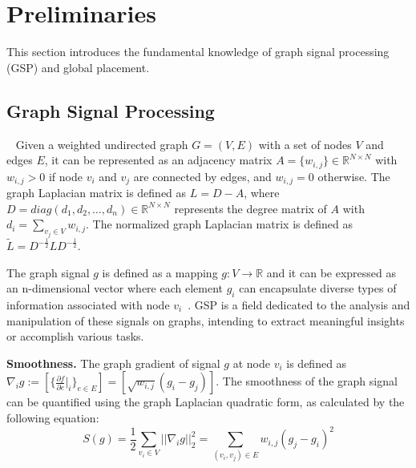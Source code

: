 \section{Preliminaries} \label{sec:pre}
This section introduces the fundamental knowledge of graph signal processing (GSP) and global placement.

\subsection{Graph Signal Processing}~\label{sec:gsp}
Given a weighted undirected graph $G = (V, E)$ with a set of nodes $V$ and edges $E$, it can be represented as an adjacency matrix $A =\{w_{i,j}\}\in \mathbb{R}^{N \times N}$ with $w_{i,j}>0$ if node $v_i$ and $v_j$ are connected by edges, and $w_{i,j}=0$ otherwise. The graph Laplacian matrix is defined as $L = D-A$, where $D =diag(d_1, d_2, \ldots, d_n )\in \mathbb{R}^{N \times N}$ represents the degree matrix of $A$ with $d_i=\sum_{v_j \in V}w_{i,j}$. The normalized graph Laplacian matrix is defined as $\tilde{L}=D^{-\frac{1}{2}}LD^{-\frac{1}{2}}$.

The graph signal $g$ is defined as a mapping $g : V \to \mathbb{R}$ and it can be expressed as an n-dimensional vector where each element $g_i$ can encapsulate diverse types of information associated with node $v_i$~\cite{graph_signal}. 
GSP is a field dedicated to the analysis and manipulation of these signals on graphs, intending to extract meaningful insights or accomplish various tasks.

\textbf{Smoothness.}
The graph gradient of signal $g$ at node $v_i$ is defined as $\nabla_ig:=[\{\frac{\partial f}{\partial e}|_i\}_{e \in E} ]=[\sqrt{w_{i,j}}(g_i-g_j)].$
The smoothness of the graph signal can be quantified using the graph Laplacian quadratic form, as calculated by the following equation:
\begin{equation}\label{eq:smoothness}
S(g)=\frac{1}{2}\sum_{v_i\in V}||\nabla_ig||_2^2=\sum_{(v_i,v_j)\in E}w_{i,j}(g_j-g_i)^2
\end{equation}

